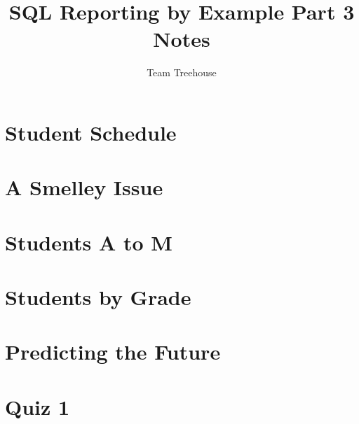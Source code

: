 \documentclass[12pt]{article}
\begin{document}
\title{SQL Reporting by Example Part 3 Notes}
\author{Team Treehouse}
\maketitle

\bigskip

\section{Student Schedule}

\bigskip

\section{A Smelley Issue}

\bigskip

\section{Students A to M}

\bigskip

\section{Students by Grade}

\bigskip

\section{Predicting the Future}

\bigskip

\section{Quiz 1}

\bigskip
\end{document}

